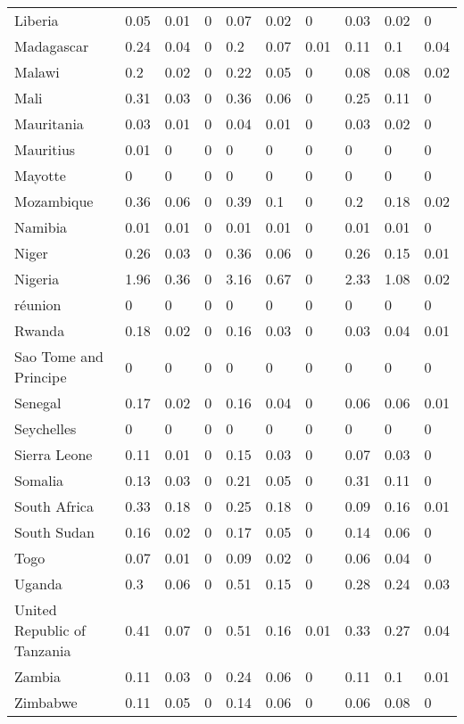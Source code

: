 \begin{longtable}[t]{llllllllll}
Liberia & 0.05 & 0.01 & 0 & 0.07 & 0.02 & 0 & 0.03 & 0.02 & 0\\
Madagascar & 0.24 & 0.04 & 0 & 0.2 & 0.07 & 0.01 & 0.11 & 0.1 & 0.04\\
Malawi & 0.2 & 0.02 & 0 & 0.22 & 0.05 & 0 & 0.08 & 0.08 & 0.02\\
Mali & 0.31 & 0.03 & 0 & 0.36 & 0.06 & 0 & 0.25 & 0.11 & 0\\
Mauritania & 0.03 & 0.01 & 0 & 0.04 & 0.01 & 0 & 0.03 & 0.02 & 0\\
Mauritius & 0.01 & 0 & 0 & 0 & 0 & 0 & 0 & 0 & 0\\
Mayotte & 0 & 0 & 0 & 0 & 0 & 0 & 0 & 0 & 0\\
Mozambique & 0.36 & 0.06 & 0 & 0.39 & 0.1 & 0 & 0.2 & 0.18 & 0.02\\
Namibia & 0.01 & 0.01 & 0 & 0.01 & 0.01 & 0 & 0.01 & 0.01 & 0\\
Niger & 0.26 & 0.03 & 0 & 0.36 & 0.06 & 0 & 0.26 & 0.15 & 0.01\\
Nigeria & 1.96 & 0.36 & 0 & 3.16 & 0.67 & 0 & 2.33 & 1.08 & 0.02\\
réunion & 0 & 0 & 0 & 0 & 0 & 0 & 0 & 0 & 0\\
Rwanda & 0.18 & 0.02 & 0 & 0.16 & 0.03 & 0 & 0.03 & 0.04 & 0.01\\
Sao Tome and Principe & 0 & 0 & 0 & 0 & 0 & 0 & 0 & 0 & 0\\
Senegal & 0.17 & 0.02 & 0 & 0.16 & 0.04 & 0 & 0.06 & 0.06 & 0.01\\
Seychelles & 0 & 0 & 0 & 0 & 0 & 0 & 0 & 0 & 0\\
Sierra Leone & 0.11 & 0.01 & 0 & 0.15 & 0.03 & 0 & 0.07 & 0.03 & 0\\
Somalia & 0.13 & 0.03 & 0 & 0.21 & 0.05 & 0 & 0.31 & 0.11 & 0\\
South Africa & 0.33 & 0.18 & 0 & 0.25 & 0.18 & 0 & 0.09 & 0.16 & 0.01\\
South Sudan & 0.16 & 0.02 & 0 & 0.17 & 0.05 & 0 & 0.14 & 0.06 & 0\\
Togo & 0.07 & 0.01 & 0 & 0.09 & 0.02 & 0 & 0.06 & 0.04 & 0\\
Uganda & 0.3 & 0.06 & 0 & 0.51 & 0.15 & 0 & 0.28 & 0.24 & 0.03\\
United Republic of Tanzania & 0.41 & 0.07 & 0 & 0.51 & 0.16 & 0.01 & 0.33 & 0.27 & 0.04\\
Zambia & 0.11 & 0.03 & 0 & 0.24 & 0.06 & 0 & 0.11 & 0.1 & 0.01\\
Zimbabwe & 0.11 & 0.05 & 0 & 0.14 & 0.06 & 0 & 0.06 & 0.08 & 0\\*
\end{longtable}
\endgroup{}
